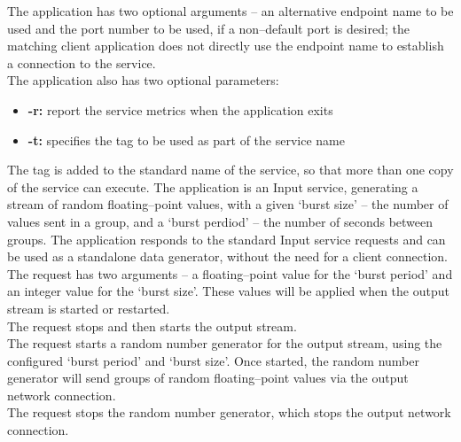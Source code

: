 The application has two optional arguments -- an alternative endpoint name to be used and
the port number to be used, if a non--default port is desired; the matching client
application does not directly use the endpoint name to establish a connection to the
service.\\

The application also has two optional parameters:
\begin{itemize}
\item \textbf{-r:} report the service metrics when the application exits
\item \textbf{-t:} specifies the tag to be used as part of the service name
\end{itemize}
The tag is added to the standard name of the service, so that more than one copy of the
service can execute.
The  application is an Input service,
generating a stream of random floating--point values, with a given `burst size' -- the
number of values sent in a group, and a `burst perdiod' -- the number of seconds between
groups.
The application responds to the standard Input service requests and can be used as a
standalone data generator, without the need for a client connection.\\

The  request has two arguments -- a
floating--point value for the `burst period' and an integer value for the `burst size'.
These values will be applied when the output stream is started or restarted.\\

The  request stops and then
starts the output stream.\\

The  request starts a random
number generator for the output stream, using the configured `burst period' and
`burst size'.
Once started, the random number generator will send groups of random floating--point
values via the output \yarp{} network connection.\\

The  request stops the random
number generator, which stops the output \yarp{} network connection.\\ 

